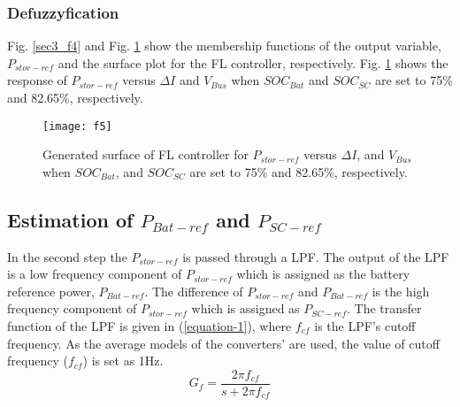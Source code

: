 \subsubsection{Defuzzyfication}
Fig. \ref{sec3_f4} and Fig. \ref{sec3_f5} show the membership functions of the output variable, $P_{stor-ref}$ and the surface plot for the FL controller, respectively.  Fig. \ref{sec3_f5} shows the response of $P_{stor-ref}$ versus $\Delta I$ and $V_{Bus}$ when $SOC_{Bat}$ and $SOC_{SC}$ are set to 75\% and 82.65\%, respectively.
\begin{figure}[ht!]
\centering
\texttt{[image: f5]}
\caption{Generated surface of FL controller for $P_{stor-ref}$ versus $\Delta I$, and $V_{Bus}$ when $SOC_{Bat}$, and $SOC_{SC}$ are set to 75\% and 82.65\%, respectively.} 
\label{sec3_f5}
\end{figure} 
\subsection{Estimation of $P_{Bat-ref}$ and $P_{SC-ref}$}
In the second step the $P_{stor-ref}$ is passed through a LPF. The output of the LPF is a low frequency component of $P_{stor-ref}$ which is assigned as the battery reference power, $P_{Bat-ref}$. The difference of $P_{stor-ref}$ and $P_{Bat-ref}$ is the high frequency component of $P_{stor-ref}$ which is assigned as  $P_{SC-ref}$. The transfer function of the LPF is given in (\ref{equation-1}), where $f_{cf}$ is the LPF’s cutoff frequency. As the average models of the converters' are used, the value of cutoff frequency ($f_{cf}$) is set as 1Hz.  
\begin{equation} \label{equation-1}
G_f=\frac {2\pi f_{cf}}{s+2\pi f_{cf}}
\end{equation}
